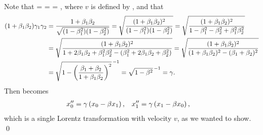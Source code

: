 \begin{solution}
	Note that
	\beq
		 =  
		= 
		= \bet,
	\eeq
	where $v$ is defined by , and that
	\begin{align*}
		(1 + \beta_1 \beta_2) \gamma_1 \gamma_2 &= \frac{1 + \beta_1 \beta_2}{\sqrt{(1 - \beta_1^2) (1 - \beta_2^2)}}
		= \sqrt{\frac{(1 + \beta_1 \beta_2)^2}{(1 - \beta_1^2) (1 - \beta_2^2)}}
		= \sqrt{\frac{(1 + \beta_1 \beta_2)^2}{1 - \beta_1^2 - \beta_2^2 + \beta_1^2 \beta_2^2}} \\
		&= \sqrt{\frac{(1 + \beta_1 \beta_2)^2}{1 + 2 \beta_1 \beta_2 + \beta_1^2 \beta_2^2 - (\beta_1^2 + 2 \beta_1 \beta_2 + \beta_2^2)}}
		= \sqrt{\frac{(1 + \beta_1 \beta_2)^2}{(1 + \beta_1 \beta_2)^2 - (\beta_1 + \beta_2)^2}} \\
		&= \sqrt{1 - \left( \frac{\beta_1 + \beta_2}{1 + \beta_1 \beta_2} \right)^2}^{\,-1}
		= \sqrt{1 - \beta^2}^{\,-1}
		= \gamma.
	\end{align*}
	Then  becomes
	\begin{align*}
		x_0'' &= \gamma \left( x_0 - \beta x_1 \right), &
		x_1'' &= \gamma \left( x_1 - \beta x_0 \right),
	\end{align*}
	which is a single Lorentz transformation with velocity $v$, as we wanted to show. \qed
\end{solution}